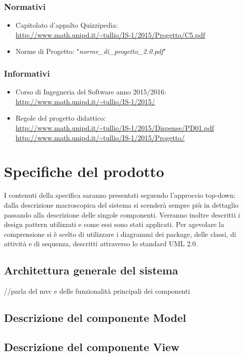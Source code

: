 \documentclass[a4paper,11pt]{article}
\begin{document}
		\subsubsection{Normativi}
		\begin{itemize}
			\item Capitolato d'appalto Quizzipedia:\\
			\url{http://www.math.unipd.it/~tullio/IS-1/2015/Progetto/C5.pdf}
			\item Norme di Progetto: "\textit{norme\_di\_progetto\_2.0.pdf}"
		\end{itemize}
		\subsubsection{Informativi}
		\begin{itemize}
			\item Corso di Ingegneria del Software anno 2015/2016:\\
			\url{http://www.math.unipd.it/~tullio/IS-1/2015/}
			\item Regole del progetto didattico:\\
			\url{http://www.math.unipd.it/~tullio/IS-1/2015/Dispense/PD01.pdf}
			\url{http://www.math.unipd.it/~tullio/IS-1/2015/Progetto/}\\
			\end{itemize}
	\pagebreak
	\newpage
	\section{Specifiche del prodotto}
	I contenuti della specifica saranno presentati seguendo l'approccio top-down: dalla descrizione macroscopica del sistema si scenderà sempre più in dettaglio passando alla descrizione delle singole componenti. Verranno inoltre descritti i design pattern utilizzati e come essi sono stati applicati. Per agevolare la comprensione si è scelto di utilizzare i diagrammi dei package, delle classi, di attività e di sequenza, descritti attraverso lo standard UML 2.0.
	
	\subsection{Architettura generale del sistema}
	//parla del mvc e delle funzionalità principali dei componenti
	\subsection{Descrizione del componente Model}
	\subsection{Descrizione del componente View}	
\end{document}
